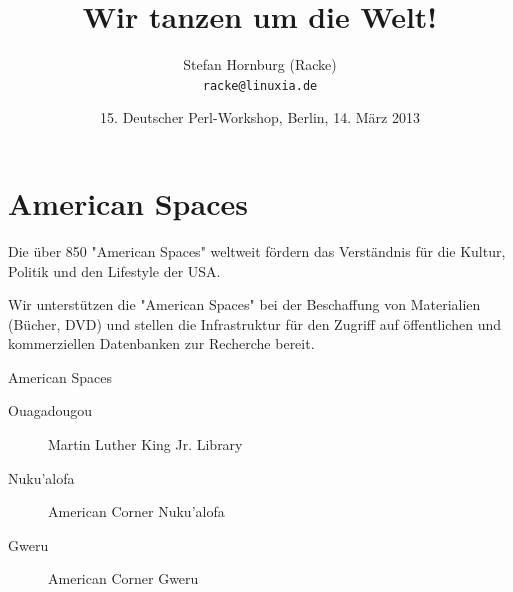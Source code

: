 \usepackage[utf8]{inputenc}
\usepackage[T1]{fontenc}
\usepackage{mathptmx}
\usepackage[scaled=.90]{helvet}
\usepackage{courier}
\usepackage{caption}
\captionsetup{labelformat=empty,labelsep=none}
\usepackage{beamerthemesplit}
\usepackage{verbatim}
\usepackage{hyperref}
\usepackage{listings}
\lstset{language=Perl,basicstyle=\footnotesize,tabsize=3,showstringspaces=false}

\title{Wir tanzen um die Welt!}
\author[racke]{Stefan Hornburg (Racke)\\ \texttt{racke@linuxia.de}}
\date{15. Deutscher Perl-Workshop, Berlin, 14. März 2013}


\maketitle{}

\begin{frame}
  \titlepage
\end{frame}

\tableofcontents

\section{American Spaces}

Die über 850 "American Spaces" weltweit fördern das Verständnis für die Kultur, Politik und den Lifestyle der USA. 

Wir unterstützen die "American Spaces" bei der Beschaffung von Materialien
(Bücher, DVD) und stellen die Infrastruktur für den Zugriff auf öffentlichen
und kommerziellen Datenbanken zur Recherche bereit.

\begin{frame}{American Spaces}
\begin{description}
\item[Ouagadougou] Martin Luther King Jr. Library
\item[Nuku'alofa] American Corner Nuku'alofa

\item[Gweru] American Corner Gweru

\end{description}
\end{frame}

